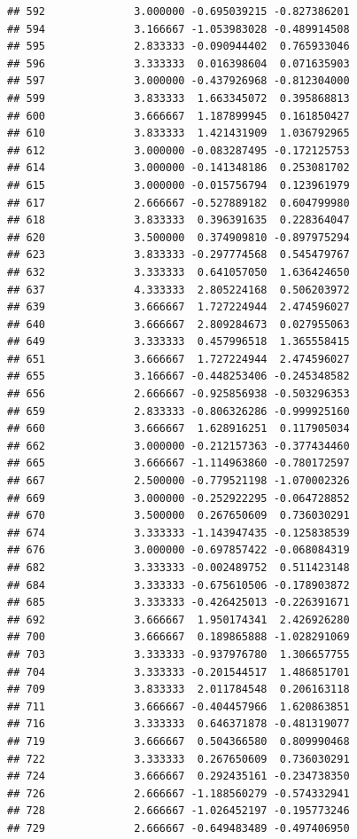 \documentclass[
]{article}
\begin{document}
\begin{verbatim}
## 592              3.000000 -0.695039215 -0.827386201
## 594              3.166667 -1.053983028 -0.489914508
## 595              2.833333 -0.090944402  0.765933046
## 596              3.333333  0.016398604  0.071635903
## 597              3.000000 -0.437926968 -0.812304000
## 599              3.833333  1.663345072  0.395868813
## 600              3.666667  1.187899945  0.161850427
## 610              3.833333  1.421431909  1.036792965
## 612              3.000000 -0.083287495 -0.172125753
## 614              3.000000 -0.141348186  0.253081702
## 615              3.000000 -0.015756794  0.123961979
## 617              2.666667 -0.527889182  0.604799980
## 618              3.833333  0.396391635  0.228364047
## 620              3.500000  0.374909810 -0.897975294
## 623              3.833333 -0.297774568  0.545479767
## 632              3.333333  0.641057050  1.636424650
## 637              4.333333  2.805224168  0.506203972
## 639              3.666667  1.727224944  2.474596027
## 640              3.666667  2.809284673  0.027955063
## 649              3.333333  0.457996518  1.365558415
## 651              3.666667  1.727224944  2.474596027
## 655              3.166667 -0.448253406 -0.245348582
## 656              2.666667 -0.925856938 -0.503296353
## 659              2.833333 -0.806326286 -0.999925160
## 660              3.666667  1.628916251  0.117905034
## 662              3.000000 -0.212157363 -0.377434460
## 665              3.666667 -1.114963860 -0.780172597
## 667              2.500000 -0.779521198 -1.070002326
## 669              3.000000 -0.252922295 -0.064728852
## 670              3.500000  0.267650609  0.736030291
## 674              3.333333 -1.143947435 -0.125838539
## 676              3.000000 -0.697857422 -0.068084319
## 682              3.333333 -0.002489752  0.511423148
## 684              3.333333 -0.675610506 -0.178903872
## 685              3.333333 -0.426425013 -0.226391671
## 692              3.666667  1.950174341  2.426926280
## 700              3.666667  0.189865888 -1.028291069
## 703              3.333333 -0.937976780  1.306657755
## 704              3.333333 -0.201544517  1.486851701
## 709              3.833333  2.011784548  0.206163118
## 711              3.666667 -0.404457966  1.620863851
## 716              3.333333  0.646371878 -0.481319077
## 719              3.666667  0.504366580  0.809990468
## 722              3.333333  0.267650609  0.736030291
## 724              3.666667  0.292435161 -0.234738350
## 726              2.666667 -1.188560279 -0.574332941
## 728              2.666667 -1.026452197 -0.195773246
## 729              2.666667 -0.649483489 -0.497406950

\end{verbatim}
\end{document}
